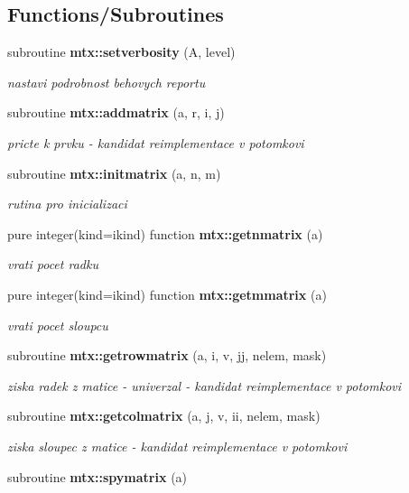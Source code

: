 \subsection*{Functions/\+Subroutines}
\begin{DoxyCompactItemize}
\item 
subroutine {\bf mtx\+::setverbosity} (A, level)
\begin{DoxyCompactList}\small\item\em nastavi podrobnost behovych reportu \end{DoxyCompactList}\item 
subroutine {\bf mtx\+::addmatrix} (a, r, i, j)
\begin{DoxyCompactList}\small\item\em pricte k prvku -\/ kandidat reimplementace v potomkovi \end{DoxyCompactList}\item 
subroutine {\bf mtx\+::initmatrix} (a, n, m)
\begin{DoxyCompactList}\small\item\em rutina pro inicializaci \end{DoxyCompactList}\item 
pure integer(kind=ikind) function {\bf mtx\+::getnmatrix} (a)
\begin{DoxyCompactList}\small\item\em vrati pocet radku \end{DoxyCompactList}\item 
pure integer(kind=ikind) function {\bf mtx\+::getmmatrix} (a)
\begin{DoxyCompactList}\small\item\em vrati pocet sloupcu \end{DoxyCompactList}\item 
subroutine {\bf mtx\+::getrowmatrix} (a, i, v, jj, nelem, mask)
\begin{DoxyCompactList}\small\item\em ziska radek z matice -\/ univerzal -\/ kandidat reimplementace v potomkovi \end{DoxyCompactList}\item 
subroutine {\bf mtx\+::getcolmatrix} (a, j, v, ii, nelem, mask)
\begin{DoxyCompactList}\small\item\em ziska sloupec z matice -\/ kandidat reimplementace v potomkovi \end{DoxyCompactList}\item 
subroutine {\bf mtx\+::spymatrix} (a)

\end{DoxyCompactItemize}
